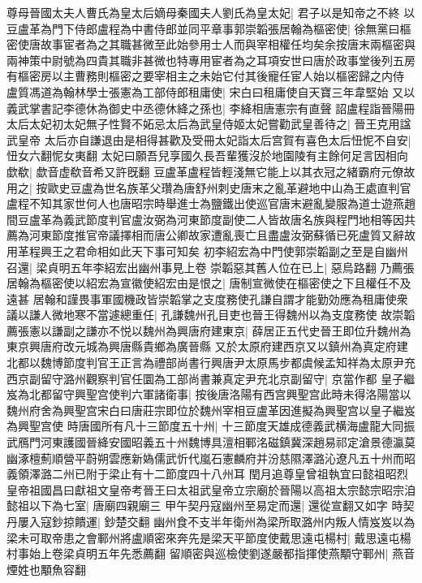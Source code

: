 尊母晉國太夫人曹氏為皇太后嫡母秦國夫人劉氏為皇太妃|{
	君子以是知帝之不終}
以豆盧革為門下侍郎盧程為中書侍郎並同平章事郭崇韜張居翰為樞密使|{
	徐無黨曰樞密使唐故事宦者為之其職甚微至此始參用士人而與宰相權任均矣余按唐末兩樞密與兩神策中尉號為四貴其職非甚微也特專用宦者為之耳項安世曰唐於政事堂後列五房有樞密房以主曹務則樞密之要宰相主之未始它付其後寵任宦人始以樞密歸之内侍}
盧質馮道為翰林學士張憲為工部侍郎租庸使|{
	宋白曰租庸使自天寶三年韋堅始}
又以義武掌書記李德休為御史中丞德休絳之孫也|{
	李絳相唐憲宗有直聲}
詔盧程詣晉陽冊太后太妃初太妃無子性賢不妬忌太后為武皇侍姬太妃嘗勸武皇善待之|{
	晉王克用諡武皇帝}
太后亦自謙退由是相得甚歡及受冊太妃詣太后宫賀有喜色太后忸怩不自安|{
	忸女六翻怩女夷翻}
太妃曰願吾兒享國久長吾輩獲沒於地園陵有主餘何足言因相向歔欷|{
	歔音虚欷音希又許旣翻}
豆盧革盧程皆輕淺無它能上以其衣冠之緒霸府元僚故用之|{
	按歐史豆盧為世名族革父瓚為唐舒州刺史唐末之亂革避地中山為王處直判官盧程不知其家世何人也唐昭宗時舉進士為鹽鐵出使巡官唐末避亂變服為道士遊燕趙間豆盧革為義武節度判官盧汝弼為河東節度副使二人皆故唐名族與程門地相等因共薦為河東節度推官帝議擇相而唐公卿故家遭亂喪亡且盡盧汝弼蘇循已死盧質又辭故用革程興王之君命相如此天下事可知矣}
初李紹宏為中門使郭崇韜副之至是自幽州召還|{
	梁貞明五年李紹宏出幽州事見上卷}
崇韜惡其舊人位在已上|{
	惡烏路翻}
乃薦張居翰為樞密使以紹宏為宣徽使紹宏由是恨之|{
	唐制宣微使在樞密使之下且權任不及遠甚}
居翰和謹畏事軍國機政皆崇韜掌之支度務使孔謙自謂才能勤効應為租庸使衆議以謙人微地寒不當遽總重任|{
	孔謙魏州孔目吏也晉王得魏州以為支度務使}
故崇韜薦張憲以謙副之謙亦不悦以魏州為興唐府建東京|{
	薛居正五代史晉王即位升魏州為東京興唐府改元城為興唐縣貴鄉為廣晉縣}
又於太原府建西京又以鎮州為真定府建北都以魏博節度判官王正言為禮部尚書行興唐尹太原馬步都虞候孟知祥為太原尹充西京副留守潞州觀察判官任圜為工部尚書兼真定尹充北京副留守|{
	京當作都}
皇子繼岌為北都留守興聖宫使判六軍諸衛事|{
	按後唐洛陽有西宫興聖宫此時未得洛陽當以魏州府舍為興聖宫宋白曰唐莊宗即位於魏州宰相豆盧革因進擬為興聖宫以皇子繼岌為興聖宫使}
時唐國所有凡十三節度五十州|{
	十三節度天雄成德義武横海盧龍大同振武鴈門河東護國晉絳安國昭義五十州魏博具澶相鄆洺磁鎮冀深趙易祁定滄景德瀛莫幽涿檀薊順營平蔚朔雲應新媯儒武忻代嵐石憲麟府并汾慈隰澤潞沁遼凡五十州而昭義領澤潞二州已附于梁止有十二節度四十八州耳}
閏月追尊皇曾祖執宜曰懿祖昭烈皇帝祖國昌曰獻祖文皇帝考晉王曰太祖武皇帝立宗廟於晉陽以高祖太宗懿宗昭宗洎懿祖以下為七室|{
	唐廟四親廟三}
甲午契丹寇幽州至易定而還|{
	還從宣翻又如字}
時契丹屢入寇鈔掠饋運|{
	鈔楚交翻}
幽州食不支半年衛州為梁所取潞州内叛人情岌岌以為梁未可取帝患之會鄆州將盧順密來奔先是梁天平節度使戴思遠屯楊村|{
	戴思遠屯楊村事始上卷梁貞明五年先悉薦翻}
留順密與巡檢使劉遂嚴都指揮使燕顒守鄆州|{
	燕音煙姓也顒魚容翻}
